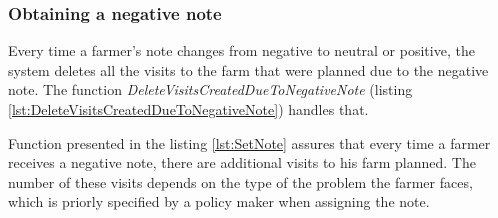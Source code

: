 

\subsubsection*{Obtaining a negative note}

Every time a farmer's note changes from negative to neutral or positive, the system deletes all the visits to the farm that were planned due to the negative note. The function \textit{DeleteVisitsCreatedDueToNegativeNote} (listing \ref{lst:DeleteVisitsCreatedDueToNegativeNote}) handles that.



Function presented in the listing \ref{lst:SetNote} assures that every time a farmer receives a negative note, there are additional visits to his farm planned. The number of these visits depends on the type of the problem the farmer faces, which is priorly specified by a policy maker when assigning the note.

